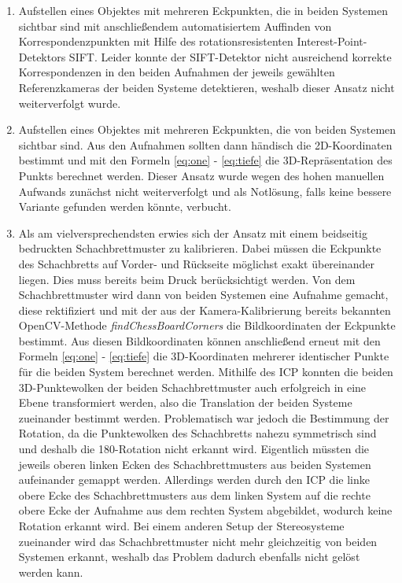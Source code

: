 \begin{enumerate}
	\item Aufstellen eines Objektes mit mehreren Eckpunkten, die in beiden Systemen sichtbar sind mit anschließendem automatisiertem Auffinden von Korrespondenzpunkten mit Hilfe des rotationsresistenten Interest-Point-Detektors SIFT. Leider konnte der SIFT-Detektor nicht ausreichend korrekte Korrespondenzen in den beiden Aufnahmen der jeweils gewählten Referenzkameras der beiden Systeme detektieren, weshalb dieser Ansatz nicht weiterverfolgt wurde.
	
	
	\item Aufstellen eines Objektes mit mehreren Eckpunkten, die von beiden Systemen sichtbar sind. Aus den Aufnahmen sollten dann händisch die 2D-Koordinaten bestimmt und mit den Formeln 
	\ref{eq:one} - \ref{eq:tiefe} die 3D-Repräsentation des Punkts berechnet werden. Dieser Ansatz wurde wegen des hohen manuellen Aufwands zunächst nicht weiterverfolgt und als Notlösung, falls keine bessere Variante gefunden werden könnte, verbucht. 
	
	\item Als am vielversprechendsten erwies sich der Ansatz mit einem beidseitig bedruckten Schachbrettmuster zu kalibrieren. Dabei müssen die Eckpunkte des Schachbretts auf Vorder- und Rückseite möglichst exakt übereinander liegen. Dies muss bereits beim Druck berücksichtigt werden. Von dem Schachbrettmuster wird dann von beiden Systemen eine Aufnahme gemacht, diese rektifiziert und mit der aus der Kamera-Kalibrierung bereits bekannten OpenCV-Methode \textit{findChessBoardCorners} die Bildkoordinaten der Eckpunkte bestimmt. Aus diesen Bildkoordinaten können anschließend erneut mit den Formeln \ref{eq:one} - \ref{eq:tiefe} die 3D-Koordinaten mehrerer identischer Punkte für die beiden System berechnet werden. \newline 
	\noindent Mithilfe des ICP konnten die beiden 3D-Punktewolken der beiden Schachbrettmuster auch erfolgreich in eine Ebene transformiert werden, also die Translation der beiden Systeme zueinander bestimmt werden. Problematisch war jedoch die Bestimmung der Rotation, da die Punktewolken des Schachbretts nahezu symmetrisch sind und deshalb die 180\degree-Rotation nicht erkannt wird. Eigentlich müssten die jeweils oberen linken Ecken des Schachbrettmusters aus beiden Systemen aufeinander gemappt werden. Allerdings werden durch den ICP die linke obere Ecke des Schachbrettmusters aus dem linken System auf die rechte obere Ecke der Aufnahme aus dem rechten System abgebildet, wodurch keine Rotation erkannt wird. Bei einem anderen Setup der Stereosysteme zueinander wird das Schachbrettmuster nicht mehr gleichzeitig von beiden Systemen erkannt, weshalb das Problem dadurch ebenfalls nicht gelöst werden kann.
	
\end{enumerate}

